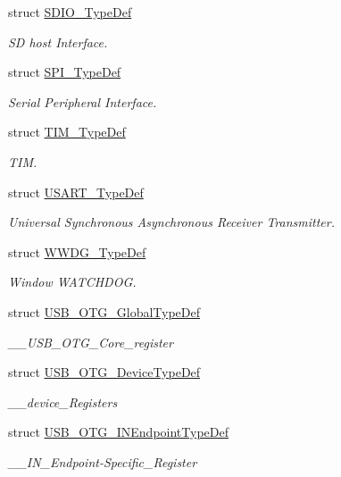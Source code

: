 \begin{DoxyCompactItemize}
struct \hyperlink{struct_s_d_i_o___type_def}{S\+D\+I\+O\+\_\+\+Type\+Def}
\begin{DoxyCompactList}\small\item\em SD host Interface. \end{DoxyCompactList}\item 
struct \hyperlink{struct_s_p_i___type_def}{S\+P\+I\+\_\+\+Type\+Def}
\begin{DoxyCompactList}\small\item\em Serial Peripheral Interface. \end{DoxyCompactList}\item 
struct \hyperlink{struct_t_i_m___type_def}{T\+I\+M\+\_\+\+Type\+Def}
\begin{DoxyCompactList}\small\item\em T\+IM. \end{DoxyCompactList}\item 
struct \hyperlink{struct_u_s_a_r_t___type_def}{U\+S\+A\+R\+T\+\_\+\+Type\+Def}
\begin{DoxyCompactList}\small\item\em Universal Synchronous Asynchronous Receiver Transmitter. \end{DoxyCompactList}\item 
struct \hyperlink{struct_w_w_d_g___type_def}{W\+W\+D\+G\+\_\+\+Type\+Def}
\begin{DoxyCompactList}\small\item\em Window W\+A\+T\+C\+H\+D\+OG. \end{DoxyCompactList}\item 
struct \hyperlink{struct_u_s_b___o_t_g___global_type_def}{U\+S\+B\+\_\+\+O\+T\+G\+\_\+\+Global\+Type\+Def}
\begin{DoxyCompactList}\small\item\em \+\_\+\+\_\+\+U\+S\+B\+\_\+\+O\+T\+G\+\_\+\+Core\+\_\+register \end{DoxyCompactList}\item 
struct \hyperlink{struct_u_s_b___o_t_g___device_type_def}{U\+S\+B\+\_\+\+O\+T\+G\+\_\+\+Device\+Type\+Def}
\begin{DoxyCompactList}\small\item\em \+\_\+\+\_\+device\+\_\+\+Registers \end{DoxyCompactList}\item 
struct \hyperlink{struct_u_s_b___o_t_g___i_n_endpoint_type_def}{U\+S\+B\+\_\+\+O\+T\+G\+\_\+\+I\+N\+Endpoint\+Type\+Def}
\begin{DoxyCompactList}\small\item\em \+\_\+\+\_\+\+I\+N\+\_\+\+Endpoint-\/\+Specific\+\_\+\+Register \end{DoxyCompactList}\item 

\end{DoxyCompactItemize}
